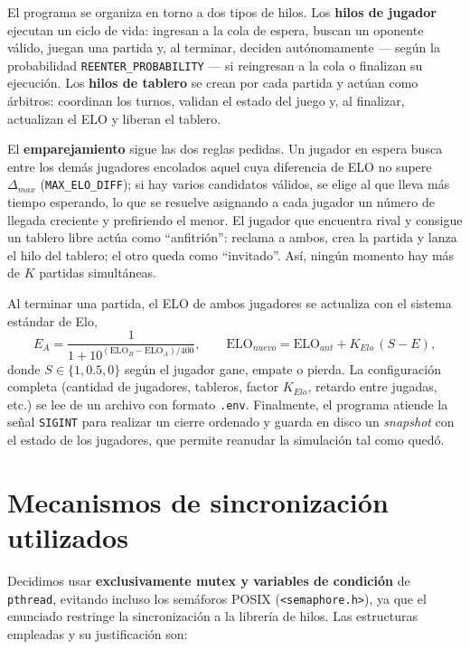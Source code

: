 \documentclass[11pt]{article}
\begin{document}
El programa se organiza en torno a dos tipos de hilos. Los \textbf{hilos de
jugador} ejecutan un ciclo de vida: ingresan a la cola de espera, buscan un
oponente válido, juegan una partida y, al terminar, deciden autónomamente
--- según la probabilidad \texttt{REENTER\_PROBABILITY} --- si reingresan a la
cola o finalizan su ejecución. Los \textbf{hilos de tablero} se crean por cada
partida y actúan como árbitros: coordinan los turnos, validan el estado del
juego y, al finalizar, actualizan el ELO y liberan el tablero.

El \textbf{emparejamiento} sigue las dos reglas pedidas. Un jugador en espera
busca entre los demás jugadores encolados aquel cuya diferencia de ELO no supere
$\Delta_{max}$ (\texttt{MAX\_ELO\_DIFF}); si hay varios candidatos válidos, se
elige al que lleva más tiempo esperando, lo que se resuelve asignando a cada
jugador un número de llegada creciente y prefiriendo el menor. El jugador que
encuentra rival y consigue un tablero libre actúa como ``anfitrión'': reclama a
ambos, crea la partida y lanza el hilo del tablero; el otro queda como
``invitado''. Así, ningún momento hay más de $K$ partidas simultáneas.

Al terminar una partida, el ELO de ambos jugadores se actualiza con el sistema
estándar de Elo,
\[
E_A = \frac{1}{1 + 10^{(\text{ELO}_B - \text{ELO}_A)/400}},
\qquad
\text{ELO}_{nuevo} = \text{ELO}_{ant} + K_{Elo}\,(S - E),
\]
donde $S \in \{1, 0.5, 0\}$ según el jugador gane, empate o pierda. La
configuración completa (cantidad de jugadores, tableros, factor $K_{Elo}$,
retardo entre jugadas, etc.) se lee de un archivo con formato \texttt{.env}.
Finalmente, el programa atiende la señal \texttt{SIGINT} para realizar un cierre
ordenado y guarda en disco un \emph{snapshot} con el estado de los jugadores,
que permite reanudar la simulación tal como quedó.

\section{Mecanismos de sincronización utilizados}

Decidimos usar \textbf{exclusivamente mutex y variables de condición} de
\texttt{pthread}, evitando incluso los semáforos POSIX (\texttt{<semaphore.h>}),
ya que el enunciado restringe la sincronización a la librería de hilos. Las
estructuras empleadas y su justificación son:
\end{document}
